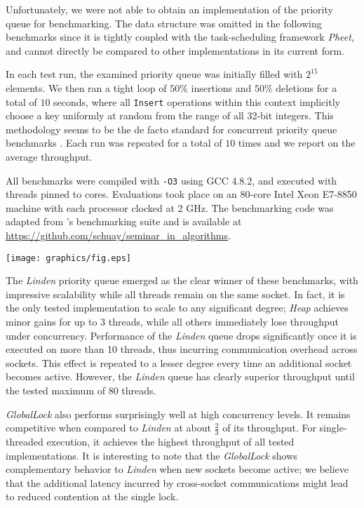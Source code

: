 Unfortunately, we were not able to obtain an implementation of the \citeauthor{shavit2000skiplist}
priority queue for benchmarking. The \citeauthor{wimmer2013data} data structure was omitted in the
following benchmarks since it is tightly coupled with the task-scheduling framework \emph{Pheet},
and cannot directly be compared to other implementations in its current form.

In each test run, the examined priority queue was initially filled with $2^{15}$
elements. We then ran a tight loop of $50\%$ insertions and $50\%$ deletions
for a total of $10$ seconds, where all \lstinline|Insert|
operations within this context implicitly choose a key uniformly at random from
the range of all 32-bit integers. This methodology seems to be the de facto standard for concurrent
priority queue benchmarks
\cite{alistarhspraylist,linden2013skiplist,shavit2000skiplist,sundell2003fast}.
Each run was repeated for a total of $10$ times
and we report on the average throughput.

All benchmarks were compiled with \verb|-O3| using GCC 4.8.2, and executed with threads pinned to
cores. Evaluations took place
on an 80-core Intel Xeon E7-8850 machine with each processor clocked at 2 GHz.
The benchmarking code was adapted from \citeauthor{linden2013skiplist}'s
benchmarking suite and is available at \url{https://github.com/schuay/seminar_in_algorithms}.

\begin{center}
\texttt{[image: graphics/fig.eps]}\end{center}

The \textit{Linden} priority queue emerged as the clear winner of these benchmarks,
with impressive scalability while all threads remain on the same socket. In fact, it is the only
tested implementation to scale to any significant degree; \textit{Heap} achieves minor gains
for up to 3 threads, while all others immediately lose throughput under concurrency.
Performance of the \textit{Linden} queue drops significantly once it is executed on more than 10
threads, thus incurring communication overhead across sockets. This effect is repeated to a lesser
degree every time an additional socket becomes active. However, the \textit{Linden} queue has
clearly superior throughput until the tested maximum of 80 threads.

\textit{GlobalLock} also performs surprisingly well at high concurrency levels.
It remains competitive when compared to \textit{Linden} at about $\frac{2}{3}$ of its throughput.
For single-threaded execution, it achieves the highest throughput of all tested implementations.
It is interesting to note that the \textit{GlobalLock} shows complementary behavior to
\textit{Linden} when new sockets become active; we believe that the additional latency incurred
by cross-socket communications might lead to reduced contention at the single lock.

